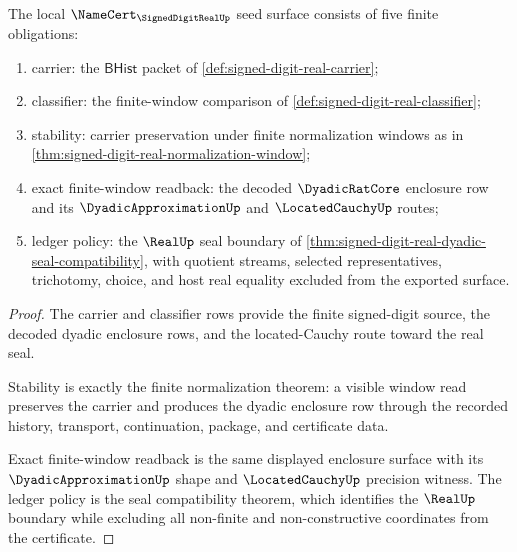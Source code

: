 \begin{theorem}
\label{thm:signed-digit-real-namecert-obligation-surface}
The local $\NameCert_{\SignedDigitRealUp}$ seed surface consists of five finite obligations:
\begin{enumerate}
\item carrier: the $\mathsf{BHist}$ packet of \autoref{def:signed-digit-real-carrier};
\item classifier: the finite-window comparison of \autoref{def:signed-digit-real-classifier};
\item stability: carrier preservation under finite normalization windows as in \autoref{thm:signed-digit-real-normalization-window};
\item exact finite-window readback: the decoded $\DyadicRatCore$ enclosure row and its $\DyadicApproximationUp$ and $\LocatedCauchyUp$ routes;
\item ledger policy: the $\RealUp$ seal boundary of \autoref{thm:signed-digit-real-dyadic-seal-compatibility}, with quotient streams, selected representatives, trichotomy, choice, and host real equality excluded from the exported surface.
\end{enumerate}
\end{theorem}
\begin{proof}
The carrier and classifier rows provide the finite signed-digit source, the decoded dyadic enclosure rows, and the located-Cauchy route toward the real seal.

Stability is exactly the finite normalization theorem: a visible window read preserves the carrier and produces the dyadic enclosure row through the recorded history, transport, continuation, package, and certificate data.

Exact finite-window readback is the same displayed enclosure surface with its $\DyadicApproximationUp$ shape and $\LocatedCauchyUp$ precision witness. The ledger policy is the seal compatibility theorem, which identifies the $\RealUp$ boundary while excluding all non-finite and non-constructive coordinates from the certificate.
\end{proof}

